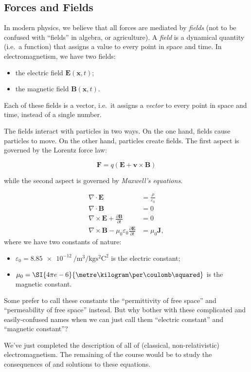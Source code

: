 \documentclass[a4paper]{article}
\begin{document}
\subsection{Forces and Fields}
In modern physics, we believe that all forces are mediated by \emph{fields} (not to be confused with ``fields'' in algebra, or agriculture). A \emph{field} is a dynamical quantity (i.e.\ a function) that assigns a value to every point in space and time. In electromagnetism, we have two fields:
\begin{itemize}
  \item the electric field $\mathbf{E}(\mathbf{x}, t)$;
  \item the magnetic field $\mathbf{B}(\mathbf{x}, t)$.
\end{itemize}
Each of these fields is a vector, i.e.\ it assigns a \emph{vector} to every point in space and time, instead of a single number.

The fields interact with particles in two ways. On the one hand, fields cause particles to move. On the other hand, particles create fields. The first aspect is governed by the Lorentz force law:
\begin{law}
\[
  \mathbf{F} = q(\mathbf{E} + \mathbf{v}\times \mathbf{B})
\]
\end{law}
\noindent while the second aspect is governed by \emph{Maxwell's equations}.
\begin{law}
  \begin{align*}
    \nabla \cdot \mathbf{E} &= \frac{\rho}{\varepsilon_0}\\
    \nabla \cdot \mathbf{B} &= 0\\
    \nabla \times \mathbf{E} +\frac{\partial \mathbf{B}}{\partial t} &= 0\\
    \nabla \times \mathbf{B} - \mu_0\varepsilon_0 \frac{\partial \mathbf{E}}{\partial t} &= \mu_0 \mathbf{J},
  \end{align*}
  where we have two constants of nature:
  \begin{itemize}
    \item $\varepsilon_0 = \SI{8.85e-12}{\per\metre\cubed\per\kilogram\s\squared\coulomb\squared}$ is the electric constant;
    \item $\mu_0 = \SI{4\pi e-6}{\metre\kilogram\per\coulomb\squared}$ is the magnetic constant.
  \end{itemize}
  Some prefer to call these constants the ``permittivity of free space'' and ``permeability of free space'' instead. But why bother with these complicated and easily-confused names when we can just call them ``electric constant'' and ``magnetic constant''?
\end{law}
We've just completed the description of all of (classical, non-relativistic) electromagnetism. The remaining of the course would be to study the consequences of and solutions to these equations.
\end{document}
